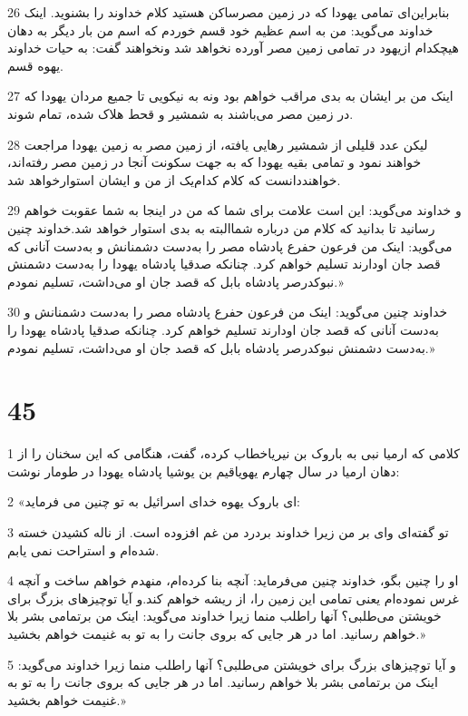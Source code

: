 \par 26 بنابراین‌ای تمامی یهودا که در زمین مصرساکن هستید کلام خداوند را بشنوید. اینک خداوند می‌گوید: من به اسم عظیم خود قسم خوردم که اسم من بار دیگر به دهان هیچکدام ازیهود در تمامی زمین مصر آورده نخواهد شد ونخواهند گفت: به حیات خداوند یهوه قسم.
\par 27 اینک من بر ایشان به بدی مراقب خواهم بود ونه به نیکویی تا جمیع مردان یهودا که در زمین مصر می‌باشند به شمشیر و قحط هلاک شده، تمام شوند.
\par 28 لیکن عدد قلیلی از شمشیر رهایی یافته، از زمین مصر به زمین یهودا مراجعت خواهند نمود و تمامی بقیه یهودا که به جهت سکونت آنجا در زمین مصر رفته‌اند، خواهنددانست که کلام کدام‌یک از من و ایشان استوارخواهد شد.
\par 29 و خداوند می‌گوید: این است علامت برای شما که من در اینجا به شما عقوبت خواهم رسانید تا بدانید که کلام من درباره شماالبته به بدی استوار خواهد شد.خداوند چنین می‌گوید: اینک من فرعون حفرع پادشاه مصر را به‌دست دشمنانش و به‌دست آنانی که قصد جان اودارند تسلیم خواهم کرد. چنانکه صدقیا پادشاه یهودا را به‌دست دشمنش نبوکدرصر پادشاه بابل که قصد جان او می‌داشت، تسلیم نمودم.»
\par 30 خداوند چنین می‌گوید: اینک من فرعون حفرع پادشاه مصر را به‌دست دشمنانش و به‌دست آنانی که قصد جان اودارند تسلیم خواهم کرد. چنانکه صدقیا پادشاه یهودا را به‌دست دشمنش نبوکدرصر پادشاه بابل که قصد جان او می‌داشت، تسلیم نمودم.»
 
\chapter{45}

\par 1 کلامی که ارمیا نبی به باروک بن نیریاخطاب کرده، گفت، هنگامی که این سخنان را از دهان ارمیا در سال چهارم یهویاقیم بن یوشیا پادشاه یهودا در طومار نوشت:
\par 2 «ای باروک یهوه خدای اسرائیل به تو چنین می فرماید:
\par 3 تو گفته‌ای وای بر من زیرا خداوند بردرد من غم افزوده است. از ناله کشیدن خسته شده‌ام و استراحت نمی یابم.
\par 4 او را چنین بگو، خداوند چنین می‌فرماید: آنچه بنا کرده‌ام، منهدم خواهم ساخت و آنچه غرس نموده‌ام یعنی تمامی این زمین را، از ریشه خواهم کند.و آیا توچیزهای بزرگ برای خویشتن می‌طلبی؟ آنها راطلب منما زیرا خداوند می‌گوید: اینک من برتمامی بشر بلا خواهم رسانید. اما در هر جایی که بروی جانت را به تو به غنیمت خواهم بخشید.»
\par 5 و آیا توچیزهای بزرگ برای خویشتن می‌طلبی؟ آنها راطلب منما زیرا خداوند می‌گوید: اینک من برتمامی بشر بلا خواهم رسانید. اما در هر جایی که بروی جانت را به تو به غنیمت خواهم بخشید.»
 
